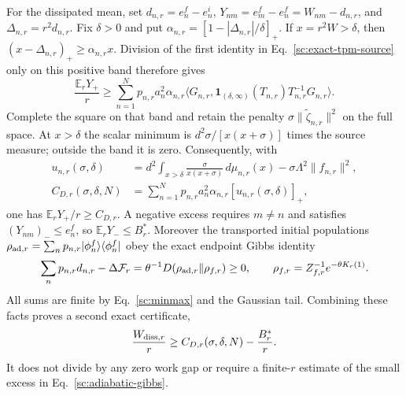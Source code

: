 \documentclass[aps,prl,reprint,superscriptaddress,longbibliography]{revtex4-2}
\begin{document}
For the dissipated mean, set
$d_{n,r}=e_n^f-e_n^i$, $Y_{nm}=e_m^f-e_n^f=W_{nm}-d_{n,r}$, and
$\Delta_{n,r}=r^2d_{n,r}$. Fix $\delta>0$ and put
$\alpha_{n,r}=[1-|\Delta_{n,r}|/\delta]_+$. If $x=r^2W>\delta$,
then $(x-\Delta_{n,r})_+\ge\alpha_{n,r}x$. Division of the first
identity in Eq.~\eqref{sc:exact-tpm-source} only on this positive band
therefore gives
\begin{equation}
 \frac{\mathbb E_rY_+}{r}\ge
 \sum_{n=1}^Np_{n,r}a_n^2\alpha_{n,r}
 \langle G_{n,r},\mathbf1_{(\delta,\infty)}(T_{n,r})
                         T_{n,r}^{-1}G_{n,r}\rangle.
 \label{sc:positive-band}
\end{equation}
Complete the square on that band and retain the penalty
$\sigma\|\widetilde\zeta_{n,r}\|^2$ on the full space. At $x>\delta$
the scalar minimum is $d^2\sigma/[x(x+\sigma)]$ times the source
measure; outside the band it is zero. Consequently, with
\begin{align}
 u_{n,r}(\sigma,\delta)&=
 d^2\int_{x>\delta}\frac{\sigma}{x(x+\sigma)}\,d\mu_{n,r}(x)
 -\sigma\Lambda^2\|f_{n,r}\|^2,\\
 C_{D,r}(\sigma,\delta,N)&=
 \sum_{n=1}^Np_{n,r}a_n^2\alpha_{n,r}
                    [u_{n,r}(\sigma,\delta)]_+,
 \label{sc:finite-mean-bracket}
\end{align}
one has $\mathbb E_rY_+/r\ge C_{D,r}$. A negative excess requires
$m\ne n$ and satisfies $(Y_{nm})_-\le e_n^f$, so
$\mathbb E_rY_-\le B_r^*$. Moreover the transported initial populations
$\rho_{{\rm ad},r}=\sum_np_{n,r}|\phi_n^f\rangle\langle\phi_n^f|$
obey the exact endpoint Gibbs identity
\begin{equation}
 \sum_np_{n,r}d_{n,r}-\Delta\mathcal F_r
 =\theta^{-1}D(\rho_{{\rm ad},r}\Vert\rho_{f,r})\ge0,
 \qquad \rho_{f,r}=Z_{f,r}^{-1}e^{-\theta K_r(1)}.
 \label{sc:adiabatic-gibbs}
\end{equation}
All sums are finite by Eq.~\eqref{sc:minmax} and the Gaussian tail.
Combining these facts proves a second exact certificate,
\begin{equation}
 \frac{W_{{\rm diss},r}}r
 \ge C_{D,r}(\sigma,\delta,N)-\frac{B_r^*}{r}.
 \label{sc:dissipation-certificate}
\end{equation}
It does not divide by any zero work gap or require a finite-$r$ estimate
of the small excess in Eq.~\eqref{sc:adiabatic-gibbs}.
\end{document}
